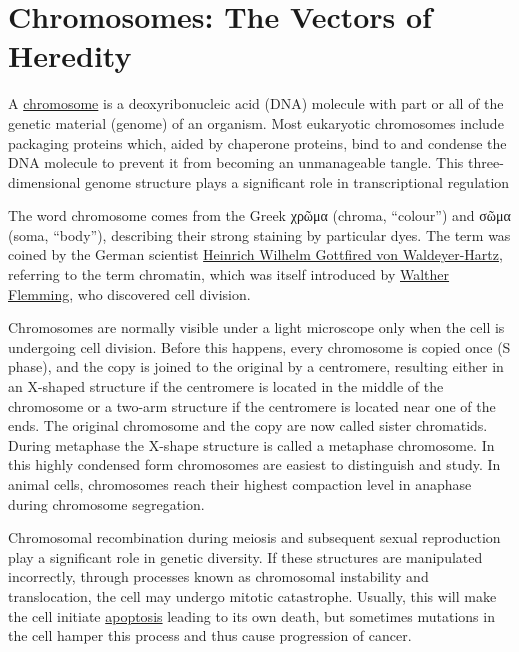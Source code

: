 \hypertarget{chromosomes-the-vectors-of-heredity}{%
\chapter{Chromosomes: The Vectors of Heredity}\label{chromosomes-the-vectors-of-heredity}}

A \href{https://en.wikipedia.org/wiki/Chromosome}{chromosome} is a deoxyribonucleic acid (DNA) molecule with part or all of the genetic material (genome) of an organism. Most eukaryotic chromosomes include packaging proteins which, aided by chaperone proteins, bind to and condense the DNA molecule to prevent it from becoming an unmanageable tangle. This three-dimensional genome structure plays a significant role in transcriptional regulation

The word chromosome comes from the Greek χρῶμα (chroma, ``colour'') and σῶμα (soma, ``body''), describing their strong staining by particular dyes. The term was coined by the German scientist \href{https://en.wikipedia.org/wiki/Heinrich_Wilhelm_Gottfried_von_Waldeyer-Hartz}{Heinrich Wilhelm Gottfired von Waldeyer-Hartz}, referring to the term chromatin, which was itself introduced by \href{https://en.wikipedia.org/wiki/Walther_Flemming}{Walther Flemming}, who discovered cell division.

Chromosomes are normally visible under a light microscope only when the cell is undergoing cell division. Before this happens, every chromosome is copied once (S phase), and the copy is joined to the original by a centromere, resulting either in an X-shaped structure if the centromere is located in the middle of the chromosome or a two-arm structure if the centromere is located near one of the ends. The original chromosome and the copy are now called sister chromatids. During metaphase the X-shape structure is called a metaphase chromosome. In this highly condensed form chromosomes are easiest to distinguish and study. In animal cells, chromosomes reach their highest compaction level in anaphase during chromosome segregation.

Chromosomal recombination during meiosis and subsequent sexual reproduction play a significant role in genetic diversity. If these structures are manipulated incorrectly, through processes known as chromosomal instability and translocation, the cell may undergo mitotic catastrophe. Usually, this will make the cell initiate \href{https://en.wikipedia.org/wiki/Apoptosis}{apoptosis} leading to its own death, but sometimes mutations in the cell hamper this process and thus cause progression of cancer.

